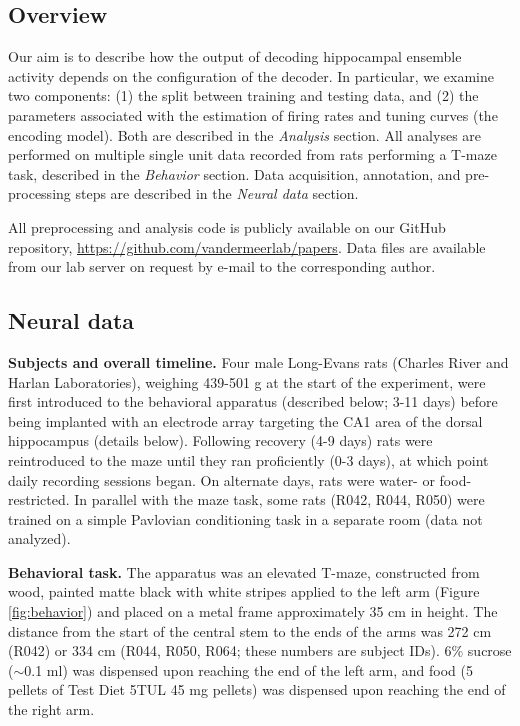 \documentclass[11pt]{article}
\begin{document}
\subsection*{Overview}

Our aim is to describe how the output of decoding hippocampal ensemble
activity depends on the configuration of the decoder. In particular,
we examine two components: (1) the split between training and testing
data, and (2) the parameters associated with the estimation of firing
rates and tuning curves (the encoding model). Both are described in
the {\it Analysis} section. All analyses are performed on multiple
single unit data recorded from rats performing a T-maze task,
described in the {\it Behavior} section. Data acquisition, annotation,
and pre-processing steps are described in the {\it Neural data}
section.

All preprocessing and analysis code is publicly available on our
GitHub repository, \url{https://github.com/vandermeerlab/papers}. Data
files are available from our lab server on request by e-mail to the
corresponding author.

\subsection*{Neural data}

{\bf Subjects and overall timeline.} Four male Long-Evans rats
(Charles River and Harlan Laboratories), weighing 439-501 g at the
start of the experiment, were first introduced to the behavioral
apparatus (described below; 3-11 days) before being implanted with an
electrode array targeting the CA1 area of the dorsal hippocampus
(details below). Following recovery (4-9 days) rats were reintroduced
to the maze until they ran proficiently (0-3 days), at which point
daily recording sessions began. On alternate days, rats were water- or
food-restricted. In parallel with the maze task, some rats (R042,
R044, R050) were trained on a simple Pavlovian conditioning task in a
separate room (data not analyzed).

{\bf Behavioral task.} The apparatus was an elevated T-maze,
constructed from wood, painted matte black with white stripes applied
to the left arm (Figure \ref{fig:behavior}) and placed on a metal
frame {\color{black} approximately} 35 cm in height. The distance from
the start of the central stem to the ends of the arms was 272 cm
(R042) or 334 cm (R044, R050, R064; these numbers are subject
IDs). 6\% sucrose ($\sim$0.1 ml) was dispensed upon reaching the end
of the left arm, and food (5 pellets of Test Diet 5TUL 45 mg pellets)
was dispensed upon reaching the end of the right arm.
\end{document}
